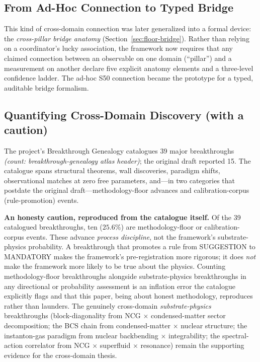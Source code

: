 \documentclass[12pt,a4paper]{article}
\newcommand{\countnote}[1]{{\small\textit{(count: #1)}}}
\begin{document}
\subsection{From Ad-Hoc Connection to Typed Bridge}

This kind of cross-domain connection was later generalized into a formal device: the \emph{cross-pillar bridge anatomy} (Section~\ref{sec:floor-bridge}). Rather than relying on a coordinator's lucky association, the framework now requires that any claimed connection between an observable on one domain (``pillar'') and a measurement on another declare five explicit anatomy elements and a three-level confidence ladder. The ad-hoc S50 connection became the prototype for a typed, auditable bridge formalism.

\subsection{Quantifying Cross-Domain Discovery (with a caution)}

The project's Breakthrough Genealogy catalogues 39 major breakthroughs \countnote{breakthrough-genealogy atlas header}; the original draft reported 15. The catalogue spans structural theorems, wall discoveries, paradigm shifts, observational matches at zero free parameters, and---in two categories that postdate the original draft---methodology-floor advances and calibration-corpus (rule-promotion) events.

\textbf{An honesty caution, reproduced from the catalogue itself.} Of the 39 catalogued breakthroughs, ten ($25.6\%$) are methodology-floor or calibration-corpus events. These advance \emph{process discipline}, not the framework's substrate-physics probability. A breakthrough that promotes a rule from SUGGESTION to MANDATORY makes the framework's pre-registration more rigorous; it does \emph{not} make the framework more likely to be true about the physics. Counting methodology-floor breakthroughs alongside substrate-physics breakthroughs in any directional or probability assessment is an inflation error the catalogue explicitly flags and that this paper, being about honest methodology, reproduces rather than launders. The genuinely cross-domain \emph{substrate-physics} breakthroughs (block-diagonality from NCG $\times$ condensed-matter sector decomposition; the BCS chain from condensed-matter $\times$ nuclear structure; the instanton-gas paradigm from nuclear backbending $\times$ integrability; the spectral-action correlator from NCG $\times$ superfluid $\times$ resonance) remain the supporting evidence for the cross-domain thesis.
\end{document}
